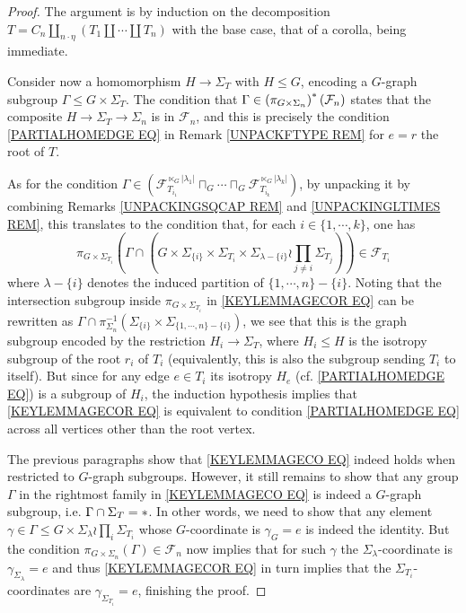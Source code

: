 \documentclass[a4paper,10pt
,draft
]{article}%
\numberwithin{equation}{section}
\numberwithin{figure}{section}
\theoremstyle{definition} %
\newcommand{\1}{\ensuremath{\mathbbm 1}}%
\begin{document}
\begin{proof} The argument is by induction on the decomposition
      $T= C_n \amalg_{n \cdot \eta}(T_1 \amalg \cdots \amalg T_n)$
      with the base case, that of a corolla, being immediate.
      
      Consider now a
      homomorphism $H \to \Sigma_T$ with $H \leq G$, encoding a 
      $G$-graph subgroup $\Gamma \leq G \times \Sigma_T$.
	The condition that $\Gamma \in \left(\pi_{G \times \Sigma_n}\right)^{\**}(\mathcal{F}_n)$ states that the composite $H \to \Sigma_T \to \Sigma_n$ is in $\mathcal{F}_n$, 
	and this is precisely the condition \eqref{PARTIALHOMEDGE EQ} in Remark \ref{UNPACKFTYPE REM}
	for $e=r$ the root of $T$.

As for the condition 
	$ \Gamma \in 
	\left(
	\mathcal{F}_{T_{i_1}}^{\ltimes_G |\lambda_1|}
		\sqcap_G \cdots \sqcap_G
	\mathcal{F}_{T_{i_k}}^{\ltimes_G |\lambda_k|}
	\right)	$, by unpacking it by combining 
	Remarks \ref{UNPACKINGSQCAP REM} and 
	\ref{UNPACKINGLTIMES REM},
	this translates to the condition that, for each $i \in \{1,\cdots,k\}$, one has
	\begin{equation}\label{KEYLEMMAGECOR EQ}
	\pi_{G \times \Sigma_{T_i}}
	\left(
		\Gamma \cap 
	\left(
		G \times \Sigma_{\{i\}} \times \Sigma_{T_i}
		\times 
		\Sigma_{\lambda-\{i\}} \wr \prod_{j\neq i} \Sigma_{T_j}
	\right)
	\right)	
	\in \mathcal{F}_{T_i}
	\end{equation}
where $\lambda - \{i\}$ denotes the induced partition of 
$\{1,\cdots,n\} - \{i\}$.
Noting that the intersection subgroup inside $\pi_{G \times \Sigma_{T_i}}$ in \eqref{KEYLEMMAGECOR EQ} can be rewritten as 
$\Gamma \cap \pi_{\Sigma_n}^{-1}
(\Sigma_{\{i\}} \times \Sigma_{\{1,\cdots,n\} - \{i\}})$,
we see that this is the graph subgroup
encoded by the restriction $H_i \to \Sigma_T$,
where $H_i \leq H$ is the isotropy subgroup of the root $r_i$ of $T_i$ (equivalently, this is also the subgroup sending $T_i$ to itself).
But since for any edge $e \in T_i$ its isotropy $H_e$ 
(cf. \eqref{PARTIALHOMEDGE EQ}) is a subgroup of $H_i$, the induction hypothesis implies that \eqref{KEYLEMMAGECOR EQ}
is equivalent to condition \eqref{PARTIALHOMEDGE EQ} 
across all vertices other than the root vertex.

The previous paragraphs show that 
\eqref{KEYLEMMAGECO EQ}
indeed holds when restricted to $G$-graph subgroups. However, it still remains to show that any group $\Gamma$ in the rightmost family in \eqref{KEYLEMMAGECO EQ} is indeed
a $G$-graph subgroup, i.e. $\Gamma \cap \Sigma_T =\**$.
In other words, we need to show that any element 
$\gamma \in \Gamma \leq
G \times \Sigma_{\lambda} \wr \prod_{i} \Sigma_{T_i}$
whose $G$-coordinate is 
$\gamma_G = e$ is indeed the identity.
But the condition 
$\pi_{G \times \Sigma_n}(\Gamma) \in \mathcal{F}_n$ now implies that for such $\gamma$ the $\Sigma_{\lambda}$-coordinate is $\gamma_{\Sigma_{\lambda}} = e$
and thus \eqref{KEYLEMMAGECOR EQ} in turn implies that the 
$\Sigma_{T_i}$-coordinates are 
$\gamma_{\Sigma_{T_i}} = e$,
finishing the proof.
\end{proof}
\end{document}
